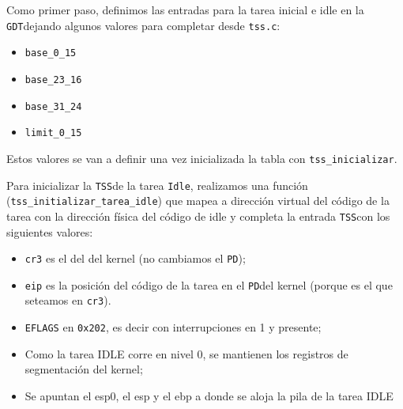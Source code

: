 \documentclass[twocolumn,10pt]{article}
\newcommand{\GDT}{\texttt{GDT}}
\newcommand{\TSS}{\texttt{TSS}}
\newcommand{\PD}{\texttt{PD}}
\begin{document}
Como primer paso, definimos las entradas para la tarea inicial e idle
en la \GDT dejando algunos valores para completar desde
\texttt{tss.c}:

\begin{itemize}
\item \texttt{base\_0\_15}
\item \texttt{base\_23\_16}
\item \texttt{base\_31\_24}
\item \texttt{limit\_0\_15}
\end{itemize} 

Estos valores se van a definir una vez inicializada la tabla con
\texttt{tss\_inicializar}.

Para inicializar la \TSS de la tarea \texttt{Idle}, realizamos una
función (\texttt{tss\_initializar\_tarea\_idle}) que mapea a dirección
virtual del código de la tarea con la dirección física del código de idle y
completa la entrada \TSS con los siguientes valores:
\begin{itemize}
\item \texttt{cr3} es el del del kernel (no cambiamos el \PD);
\item \texttt{eip} es la posición del código de la tarea en el \PD del
  kernel (porque es el que seteamos en \texttt{cr3}).
\item \texttt{EFLAGS} en \texttt{0x202}, es decir con interrupciones
  en 1 y presente;
\item Como la tarea IDLE corre en nivel 0, se mantienen los registros
  de segmentación del kernel;
\item Se apuntan el esp0, el esp y el ebp a donde se aloja la pila de
  la tarea IDLE
\end{itemize}
\end{document}
